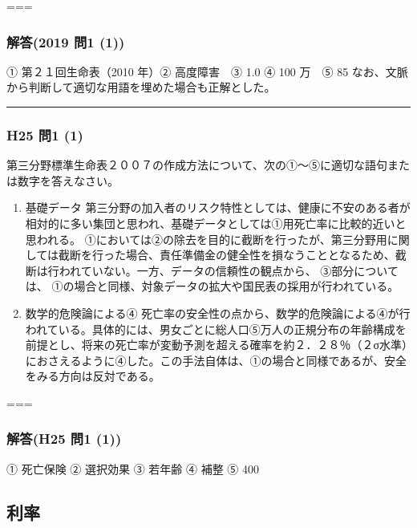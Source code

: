 \documentclass[
]{article}
\providecommand{\tightlist}{%
  \setlength{\itemsep}{0pt}\setlength{\parskip}{0pt}}
\begin{document}
===

\hypertarget{ux89e3ux7b542019-ux554f1-1}{%
\subsubsection{解答(2019 問1 (1))}\label{ux89e3ux7b542019-ux554f1-1}}

① 第２１回生命表（2010 年）② 高度障害　③ 1.0 ④ 100 万　⑤ 85
なお、文脈から判断して適切な用語を埋めた場合も正解とした。

\begin{center}\rule{0.5\linewidth}{0.5pt}\end{center}

\hypertarget{h25-ux554f1-1}{%
\subsubsection{H25 問1 (1)}\label{h25-ux554f1-1}}

第三分野標準生命表２００７の作成方法について、次の①～⑤に適切な語句または数字を答えなさい。

\begin{enumerate}
\def\labelenumi{\arabic{enumi}.}
\tightlist
\item
  基礎データ
  第三分野の加入者のリスク特性としては、健康に不安のある者が相対的に多い集団と思われ、基礎データとしては①用死亡率に比較的近いと思われる。
  ①においては②の除去を目的に截断を行ったが、第三分野用に関しては截断を行った場合、責任準備金の健全性を損なうこととなるため、截断は行われていない。一方、データの信頼性の観点から、
  ③部分については、
  ①の場合と同様、対象データの拡大や国民表の採用が行われている。
\item
  数学的危険論による④
  死亡率の安全性の点から、数学的危険論による④が行われている。具体的には、男女ごとに総人口⑤万人の正規分布の年齢構成を前提とし、将来の死亡率が変動予測を超える確率を約２．２８％（２σ水準）におさえるように④した。この手法自体は、①の場合と同様であるが、安全をみる方向は反対である。
\end{enumerate}

===

\hypertarget{ux89e3ux7b54h25-ux554f1-1}{%
\subsubsection{解答(H25 問1 (1))}\label{ux89e3ux7b54h25-ux554f1-1}}

① 死亡保険 ② 選択効果 ③ 若年齢 ④ 補整 ⑤ 400

\hypertarget{ux5229ux7387}{%
\subsection{利率}\label{ux5229ux7387}}
\end{document}
